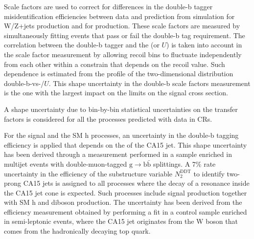 Scale factors are used to correct for differences in the double-b tagger misidentification efficiencies between data and prediction from simulation for W/Z+jets production and for \ttbar production. These scale factors are measured by simultaneously fitting events that pass or fail the double-b tag requirement. The correlation between the double-b tagger and the \ptmiss (or $U$) is taken into account in the scale factor measurement by allowing recoil bins to fluctuate independently from each other within a constrain that depends on the recoil value. Such dependence is estimated from the profile of the two-dimensional distribution double-b-vs-\ptmiss/$U$. This shape uncertainty in the double-b scale factors measurement is the one with the largest impact on the limits on the signal cross section.

A shape uncertainty due to bin-by-bin statistical uncertainties on the transfer factors is considered for all the processes predicted with data in CRs.

For the signal and the SM h processes, an uncertainty in the double-b tagging efficiency is applied that depends on the \pt of the CA15 jet. This shape uncertainty has been derived through a measurement performed in a sample enriched in multijet events with double-muon-tagged $\text{g}\to\text{b}\bar{\text{b}}$ splittings. A 7\% rate uncertainty in the efficiency of the substructure variable $N_2^\text{DDT}$ to identify two-prong CA15 jets is assigned to all processes where the decay of a resonance inside the CA15 jet cone is expected. Such processes include signal production together with SM h and diboson production. The uncertainty has been derived from the efficiency measurement obtained by performing a fit in a control sample enriched in semi-leptonic \ttbar events, where the CA15 jet originates from the W boson that comes from the hadronically decaying top quark. 


